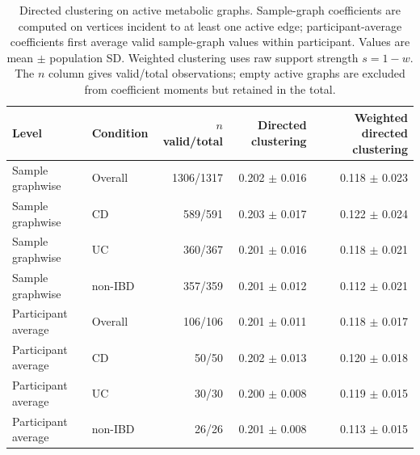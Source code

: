 \begin{table}[ht]
\centering
\caption{Directed clustering on active metabolic graphs. Sample-graph coefficients are computed on vertices incident to at least one active edge; participant-average coefficients first average valid sample-graph values within participant. Values are mean $\pm$ population SD. Weighted clustering uses raw support strength $s=1-w$. The $n$ column gives valid/total observations; empty active graphs are excluded from coefficient moments but retained in the total.}
\label{tab:directed_clustering_participant_average}
\begin{tabular}{llrrr}
\toprule
Level & Condition & $n$ valid/total & Directed clustering & Weighted directed clustering \\
\midrule
Sample graphwise & Overall & 1306/1317 & 0.202 $\pm$ 0.016 & 0.118 $\pm$ 0.023 \\
Sample graphwise & CD & 589/591 & 0.203 $\pm$ 0.017 & 0.122 $\pm$ 0.024 \\
Sample graphwise & UC & 360/367 & 0.201 $\pm$ 0.016 & 0.118 $\pm$ 0.021 \\
Sample graphwise & non-IBD & 357/359 & 0.201 $\pm$ 0.012 & 0.112 $\pm$ 0.021 \\
Participant average & Overall & 106/106 & 0.201 $\pm$ 0.011 & 0.118 $\pm$ 0.017 \\
Participant average & CD & 50/50 & 0.202 $\pm$ 0.013 & 0.120 $\pm$ 0.018 \\
Participant average & UC & 30/30 & 0.200 $\pm$ 0.008 & 0.119 $\pm$ 0.015 \\
Participant average & non-IBD & 26/26 & 0.201 $\pm$ 0.008 & 0.113 $\pm$ 0.015 \\
\bottomrule
\end{tabular}
\end{table}
